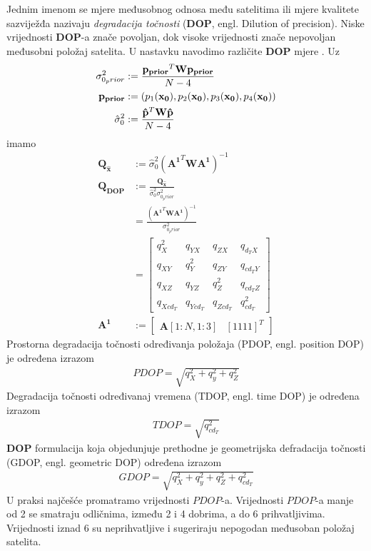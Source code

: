 \documentclass[a4paper,twoside,12pt]{memoir} %
\begin{document}
Jednim imenom se mjere međusobnog odnosa među satelitima ili mjere kvalitete sazviježđa nazivaju \textit{degradacija točnosti} (\textbf{DOP}, engl. Dilution of precision).
Niske vrijednosti \textbf{DOP}-a znače povoljan, dok 
visoke vrijednosti znače nepovoljan međusobni položaj satelita.
U nastavku navodimo različite \textbf{DOP} mjere \cite{svd_str15}.
Uz%
\begin{align}
\sigma_{0_prior}^2 & := \frac{\mathbf{p_{prior}}^T \mathbf{W}\mathbf{p_{prior}}}{N-4}\\
\mathbf{p_{prior}} & := (p_1(\mathbf{x_0}),p_2(\mathbf{x_0}),p_3(\mathbf{x_0}),p_4(\mathbf{x_0})) \notag \\
\hat{\sigma}_0^2 & := \frac{\mathbf{\hat{p}}^T \mathbf{W}\mathbf{\hat{p}}}{N - 4}
\end{align}
imamo
\begin{align}
\mathbf{Q_{\hat{x}}} & := \hat{\sigma}_0^2(\mathbf{A^1}^T\mathbf{W}\mathbf{A^1})^{-1} \\
\mathbf{Q_{DOP}} & := \frac{\mathbf{Q_{\hat{x}}}}{\hat{\sigma}_0^2 \sigma_{0_prior}^2} \\
& = \frac{(\mathbf{A^1}^T\mathbf{W}\mathbf{A^1})^{-1}}{\sigma_{0_prior}^2} \\
& = \begin{bmatrix}
q_X^2 & q_{YX} & q_{ZX} & q_{d_TX} \\
q_{XY} & q_Y^2 & q_{ZY} & q_{cd_TY} \\
q_{XZ} & q_{YZ} & q_Z^2 & q_{cd_TZ} \\
q_{Xcd_T} & q_{Ycd_T} & q_{Zcd_T} & q_{cd_T}^2 
\end{bmatrix}\\
\mathbf{A^1} & := \begin{bmatrix}
\mathbf{A}[1:N,1:3] & [1 1 1 1]^T
\end{bmatrix}
\end{align}
Prostorna degradacija točnosti određivanja položaja (PDOP, engl. position DOP) je određena izrazom
\begin{align}
PDOP = \sqrt{q_X^2+q_y^2+q_Z^2}
\end{align}
Degradacija točnosti određivanaj vremena (TDOP, engl. time DOP) je određena izrazom
\begin{align}
TDOP = \sqrt{q_{cd_T}^2}
\end{align}
\textbf{DOP} formulacija koja objedunjuje prethodne je geometrijska defradacija točnosti (GDOP, engl. geometric DOP) određena izrazom
\begin{align}
GDOP = \sqrt{q_X^2+q_y^2+q_Z^2+q_{cd_T}^2}
\end{align}
U praksi najčešće promatramo  vrijednosti $PDOP$-a. Vrijednosti $PDOP$-a manje od 2 se smatraju odličnima, između 2 i 4 dobrima, a do 6 prihvatljivima. Vrijednosti iznad 6 su neprihvatljive i sugeriraju nepogodan međusoban položaj satelita.
\end{document}
